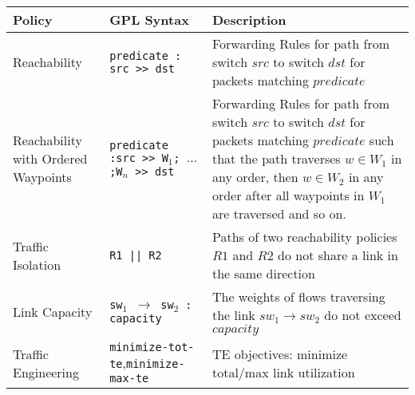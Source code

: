 \begin{table*}[thb]
\begin{small}
	\begin{center}
		\begin{tabular}{m{6em} | m{14em} | m{32em} } 
			Policy &  GPL Syntax & Description \\ 
			\hline
			Reachability & 	\texttt{predicate : src >> dst} & Forwarding Rules for path from switch $src$ to switch $dst$ for packets matching $predicate$ \\ \hline
			 Reachability with Ordered Waypoints & \texttt{predicate :\newline src >> W$_1$; $\ldots$;W$_n$ >> dst} & Forwarding Rules for path from switch $src$ to switch $dst$ for packets matching $predicate$ such that the path traverses $w \in W_1$ in any order, then $w \in W_2$ in any order after all waypoints in $W_1$ are traversed and so on.\\ \hline
			Traffic \newline Isolation & \texttt{R1 || R2} & Paths of two reachability policies $R1$ and $R2$ do not share a link in the same direction \\ \hline
			Link \newline Capacity & \texttt{sw$_1$ $\rightarrow$ sw$_2$ : capacity}  & The weights of flows traversing the link $sw_1 \rightarrow sw_2$ do not exceed $capacity$ \\ \hline
			Traffic \newline Engineering & \texttt{minimize-tot-te},\newline \texttt{minimize-max-te} & TE objectives: minimize total/max link utilization \\
		\end{tabular}
	\end{center}
	 \label{tab:policysupport} 
\end{small}
\end{table*}


